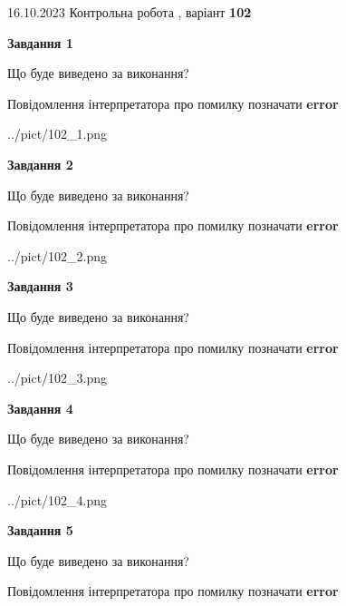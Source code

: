 \documentclass[12pt, ukrainian]{article}
\begin{document}
{\Large{16.10.2023 Контрольна робота , варіант  \No \textbf { 102 }\par}}
{
\begin {large}
{\begin {center}\textbf{Завдання 1}\end {center}}\par
Що буде виведено за виконання? \par
Повідомлення інтерпретатора про помилку позначати \textbf{error}

\begin{center}
	{../pict/102_1.png}
\end{center}
\newpage

{\begin {center}\textbf{Завдання 2}\end {center}}\par
Що буде виведено за виконання? \par
Повідомлення інтерпретатора про помилку позначати \textbf{error}

\begin{center}
	{../pict/102_2.png}
\end{center}
\newpage

{\begin {center}\textbf{Завдання 3}\end {center}}\par
Що буде виведено за виконання? \par
Повідомлення інтерпретатора про помилку позначати \textbf{error}

\begin{center}
	{../pict/102_3.png}
\end{center}
\newpage

{\begin {center}\textbf{Завдання 4}\end {center}}\par
Що буде виведено за виконання? \par
Повідомлення інтерпретатора про помилку позначати \textbf{error}

\begin{center}
	{../pict/102_4.png}
\end{center}
\newpage

{\begin {center}\textbf{Завдання 5}\end {center}}\par
Що буде виведено за виконання? \par
Повідомлення інтерпретатора про помилку позначати \textbf{error}


\end{large}}
\end{document}
